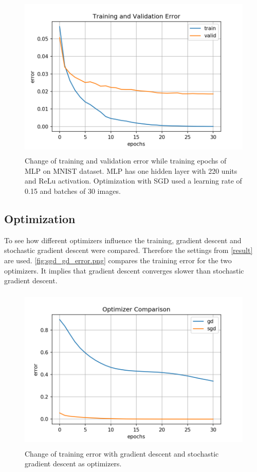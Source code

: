 \documentclass[a4paper,12pt]{article}
\begin{document}
\begin{figure}[H]
  \centering \includegraphics[width=11.70cm, height=7.9cm]{plots/train_valid_error.png}
  \caption{
    \label{fig:train_valid_error}
    Change of training and validation error while training epochs of MLP on MNIST dataset. MLP has one hidden layer with 220 units and ReLu activation. Optimization with SGD used a learning rate of 0.15 and batches of 30 images.
  }
\end{figure}

\subsection{Optimization}\label{opt}
To see how different optimizers influence the training, gradient descent and stochastic gradient descent were compared. Therefore the settings from \autoref{result} are used. \autoref{fig:sgd_gd_error.png} compares the training error for the two optimizers. It implies that gradient descent converges slower than stochastic gradient descent.


\begin{figure}[H]
	\centering \includegraphics[width=11.7cm, height=7.9cm]{plots/sgd_gd_error.png}
	\caption{
		\label{fig:sgd_gd_error.png}
		Change of training error with gradient descent and stochastic gradient descent as optimizers.
	}
\end{figure}
\end{document}

